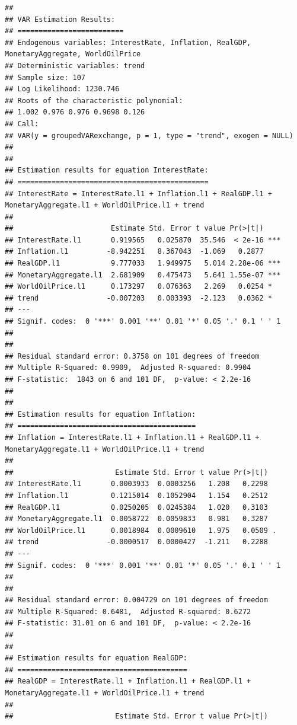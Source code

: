\documentclass[11pt,preprint, authoryear]{elsarticle}
\numberwithin{equation}{section}
\numberwithin{figure}{section}
\numberwithin{table}{section}
\begin{document}
\begin{verbatim}
## 
## VAR Estimation Results:
## ========================= 
## Endogenous variables: InterestRate, Inflation, RealGDP, MonetaryAggregate, WorldOilPrice 
## Deterministic variables: trend 
## Sample size: 107 
## Log Likelihood: 1230.746 
## Roots of the characteristic polynomial:
## 1.002 0.976 0.976 0.9698 0.126
## Call:
## VAR(y = groupedVARexchange, p = 1, type = "trend", exogen = NULL)
## 
## 
## Estimation results for equation InterestRate: 
## ============================================= 
## InterestRate = InterestRate.l1 + Inflation.l1 + RealGDP.l1 + MonetaryAggregate.l1 + WorldOilPrice.l1 + trend 
## 
##                       Estimate Std. Error t value Pr(>|t|)    
## InterestRate.l1       0.919565   0.025870  35.546  < 2e-16 ***
## Inflation.l1         -8.942251   8.367043  -1.069   0.2877    
## RealGDP.l1            9.777033   1.949975   5.014 2.28e-06 ***
## MonetaryAggregate.l1  2.681909   0.475473   5.641 1.55e-07 ***
## WorldOilPrice.l1      0.173297   0.076363   2.269   0.0254 *  
## trend                -0.007203   0.003393  -2.123   0.0362 *  
## ---
## Signif. codes:  0 '***' 0.001 '**' 0.01 '*' 0.05 '.' 0.1 ' ' 1
## 
## 
## Residual standard error: 0.3758 on 101 degrees of freedom
## Multiple R-Squared: 0.9909,  Adjusted R-squared: 0.9904 
## F-statistic:  1843 on 6 and 101 DF,  p-value: < 2.2e-16 
## 
## 
## Estimation results for equation Inflation: 
## ========================================== 
## Inflation = InterestRate.l1 + Inflation.l1 + RealGDP.l1 + MonetaryAggregate.l1 + WorldOilPrice.l1 + trend 
## 
##                        Estimate Std. Error t value Pr(>|t|)  
## InterestRate.l1       0.0003933  0.0003256   1.208   0.2298  
## Inflation.l1          0.1215014  0.1052904   1.154   0.2512  
## RealGDP.l1            0.0250205  0.0245384   1.020   0.3103  
## MonetaryAggregate.l1  0.0058722  0.0059833   0.981   0.3287  
## WorldOilPrice.l1      0.0018984  0.0009610   1.975   0.0509 .
## trend                -0.0000517  0.0000427  -1.211   0.2288  
## ---
## Signif. codes:  0 '***' 0.001 '**' 0.01 '*' 0.05 '.' 0.1 ' ' 1
## 
## 
## Residual standard error: 0.004729 on 101 degrees of freedom
## Multiple R-Squared: 0.6481,  Adjusted R-squared: 0.6272 
## F-statistic: 31.01 on 6 and 101 DF,  p-value: < 2.2e-16 
## 
## 
## Estimation results for equation RealGDP: 
## ======================================== 
## RealGDP = InterestRate.l1 + Inflation.l1 + RealGDP.l1 + MonetaryAggregate.l1 + WorldOilPrice.l1 + trend 
## 
##                        Estimate Std. Error t value Pr(>|t|)    

\end{verbatim}
\end{document}
